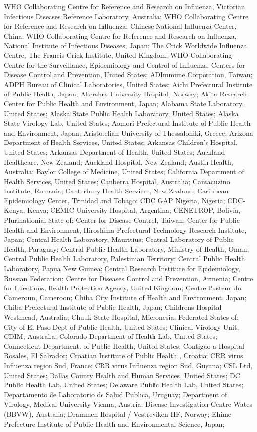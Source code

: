 WHO Collaborating Centre for Reference and Research on Influenza, Victorian Infectious Diseases Reference Laboratory, Australia; WHO Collaborating Centre for Reference and Research on Influenza, Chinese National Influenza Center, China; WHO Collaborating Centre for Reference and Research on Influenza, National Institute of Infectious Diseases, Japan; The Crick Worldwide Influenza Centre, The Francis Crick Institute, United Kingdom; WHO Collaborating Centre for the Surveillance, Epidemiology and Control of Influenza, Centers for Disease Control and Prevention, United States; ADImmune Corporation, Taiwan; ADPH Bureau of Clinical Laboratories, United States; Aichi Prefectural Institute of Public Health, Japan; Akershus University Hospital, Norway; Akita Research Center for Public Health and Environment, Japan; Alabama State Laboratory, United States; Alaska State Public Health Laboratory, United States; Alaska State Virology Lab, United States; Aomori Prefectural Institute of Public Health and Environment, Japan; Aristotelian University of Thessaloniki, Greece; Arizona Department of Health Services, United States; Arkansas Children's Hospital, United States; Arkansas Department of Health, United States; Auckland Healthcare, New Zealand; Auckland Hospital, New Zealand; Austin Health, Australia; Baylor College of Medicine, United States; California Department of Health Services, United States; Canberra Hospital, Australia; Cantacuzino Institute, Romania; Canterbury Health Services, New Zealand; Caribbean Epidemiology Center, Trinidad and Tobago; CDC GAP Nigeria, Nigeria; CDC-Kenya, Kenya; CEMIC University Hospital, Argentina; CENETROP, Bolivia, Plurinationial State of; Center for Disease Control, Taiwan; Center for Public Health and Environment, Hiroshima Prefectural Technology Research Institute, Japan; Central Health Laboratory, Mauritius; Central Laboratory of Public Health, Paraguay; Central Public Health Laboratory, Ministry of Health, Oman; Central Public Health Laboratory, Palestinian Territory; Central Public Health Laboratory, Papua New Guinea; Central Research Institute for Epidemiology, Russian Federation; Centre for Diseases Control and Prevention, Armenia; Centre for Infections, Health Protection Agency, United Kingdom; Centre Pasteur du Cameroun, Cameroon; Chiba City Institute of Health and Environment, Japan; Chiba Prefectural Institute of Public Health, Japan; Childrens Hospital Westmead, Australia; Chuuk State Hospital, Micronesia, Federated States of; City of El Paso Dept of Public Health, United States; Clinical Virology Unit, CDIM, Australia; Colorado Department of Health Lab, United States; Connecticut Department. of Public Health, United States; Contiguo a Hospital Rosales, El Salvador; Croatian Institute of Public Health , Croatia; CRR virus Influenza region Sud, France; CRR virus Influenza region Sud, Guyana; CSL Ltd, United States; Dallas County Health and Human Services, United States; DC Public Health Lab, United States; Delaware Public Health Lab, United States; Departamento de Laboratorio de Salud Publica, Uruguay; Department of Virology, Medical University Vienna, Austria; Disease Investigation Centre Wates (BBVW), Australia; Drammen Hospital / Vestreviken HF, Norway; Ehime Prefecture Institute of Public Health and Environmental Science, Japan; 